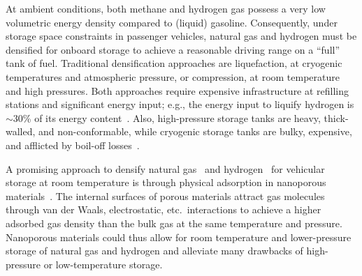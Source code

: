 \documentclass[pre,twocolumn]{revtex4-2}
\begin{document}

At ambient conditions, both methane and hydrogen gas possess a very low
volumetric energy density compared to (liquid) gasoline. Consequently, under storage
space constraints in passenger vehicles, natural gas and hydrogen must be
densified for onboard storage to achieve a reasonable driving range on a
``full'' tank of fuel. Traditional densification approaches are liquefaction,
at cryogenic temperatures and atmospheric pressure, or compression, at room
temperature and high pressures. Both approaches require expensive
infrastructure at refilling stations and significant energy input; e.g., the
energy input to liquify hydrogen is $\sim$30\% of its energy
content~\cite{bossel2003energy}. Also, high-pressure storage tanks are
heavy, thick-walled, and non-conformable, while cryogenic storage tanks are
bulky, expensive, and afflicted by boil-off losses~\cite{hasan2009minimizing}.

A promising approach to densify natural
gas~\cite{makal2012methane,mason2014evaluating} and
hydrogen~\cite{suh2011hydrogen,garcia2018benchmark} for vehicular storage at
room temperature is through physical adsorption in nanoporous
materials~\cite{schoedel2016role}. The internal surfaces of porous materials
attract gas molecules through van der Waals, electrostatic, etc.\ interactions
to achieve a higher adsorbed gas density than the bulk gas at the same
temperature and pressure.
Nanoporous materials could thus allow for room temperature and lower-pressure
storage of natural gas and hydrogen and alleviate many drawbacks of high-pressure or low-temperature
storage.
\end{document}
